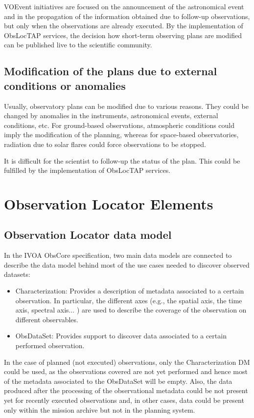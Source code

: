 \documentclass[11pt,a4paper]{ivoa}
\begin{document}
VOEvent initiatives are focused on the announcement of the astronomical event and in 
the propagation of the information obtained due to follow-up observations, but only 
when the observations are already executed. By the implementation of ObsLocTAP services, 
the decision how short-term observing plans are modified can be published live to the 
scientific community.

\subsection{Modification of the plans due to external conditions or anomalies}
Usually, observatory plans can be modified due to various reasons. They could be 
changed by anomalies in the instruments, astronomical events, external conditions, etc. 
For ground-based observations, atmospheric conditions could imply the modification 
of the planning, whereas for space-based observatories, radiation due to solar flares 
could force observations to be stopped.

It is difficult for the scientist to follow-up the status of the plan. This could be 
fulfilled by the implementation of ObsLocTAP services.

\section{Observation Locator Elements}
\subsection{Observation Locator data model }
In the IVOA ObsCore specification, two main data models are connected to describe the 
data model behind most of the use cases needed to discover observed datasets:

\begin{itemize}
	\item Characterization: Provides a description of metadata associated to a certain observation. In particular, the different axes (e.g., the spatial axis, the time axis, spectral axis$ \ldots $ ) are used to describe the coverage of the observation on different observables.
	\item ObsDataSet: Provides support to discover data associated to a certain performed observation.
\end{itemize}

In the case of planned (not executed) observations, only the Characterization DM could be
used, as the observations covered are not yet performed and hence most of the metadata 
associated to the ObsDataSet will be empty. Also, the data produced after the 
processing of the observational metadata could be not present yet for recently executed 
observations and, in other cases, data could be present only within the mission archive 
but not in the planning system. 
\end{document}
